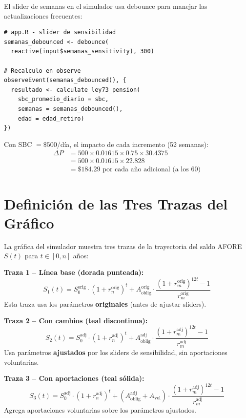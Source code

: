 \documentclass[11pt,a4paper]{report}
\theoremstyle{remark}
\begin{document}
\begin{tcolorbox}[colback=orange!5!white, colframe=orange!75!black, title=\textbf{Aplicaci\'on en C\'odigo}]
El slider de semanas en el simulador usa debounce para manejar las actualizaciones frecuentes:
\begin{lstlisting}
# app.R - slider de sensibilidad
semanas_debounced <- debounce(
  reactive(input$semanas_sensitivity), 300)

# Recalculo en observe
observeEvent(semanas_debounced(), {
  resultado <- calculate_ley73_pension(
    sbc_promedio_diario = sbc,
    semanas = semanas_debounced(),
    edad = edad_retiro)
})
\end{lstlisting}

Con SBC $= \$500$/d\'ia, el impacto de cada incremento (52 semanas):
\begin{align*}
\Delta P &= 500 \times 0.01615 \times 0.75 \times 30.4375 \\
         &= 500 \times 0.01615 \times 22.828 \\
         &= \$184.29 \text{ por cada a\~no adicional (a los 60)}
\end{align*}
\end{tcolorbox}

\section{Definici\'on de las Tres Trazas del Gr\'afico}

\begin{tcolorbox}[colback=blue!5!white, colframe=blue!75!black, title=\textbf{Definici\'on Formal}]
La gr\'afica del simulador muestra tres trazas de la trayectoria del saldo AFORE $S(t)$ para $t \in [0, n]$ a\~nos:

\textbf{Traza 1 -- L\'inea base (dorada punteada):}
\begin{equation}
S_1(t) = S_0^{\text{orig}} \cdot (1 + r_n^{\text{orig}})^t + A_{\text{oblig}}^{\text{orig}} \cdot \frac{(1+r_m^{\text{orig}})^{12t} - 1}{r_m^{\text{orig}}}
\end{equation}
Esta traza usa los par\'ametros \textbf{originales} (antes de ajustar sliders).

\textbf{Traza 2 -- Con cambios (teal discontinua):}
\begin{equation}
S_2(t) = S_0^{\text{adj}} \cdot (1 + r_n^{\text{adj}})^t + A_{\text{oblig}}^{\text{adj}} \cdot \frac{(1+r_m^{\text{adj}})^{12t} - 1}{r_m^{\text{adj}}}
\end{equation}
Usa par\'ametros \textbf{ajustados} por los sliders de sensibilidad, sin aportaciones voluntarias.

\textbf{Traza 3 -- Con aportaciones (teal s\'olida):}
\begin{equation}
S_3(t) = S_0^{\text{adj}} \cdot (1 + r_n^{\text{adj}})^t + (A_{\text{oblig}}^{\text{adj}} + A_{\text{vol}}) \cdot \frac{(1+r_m^{\text{adj}})^{12t} - 1}{r_m^{\text{adj}}}
\end{equation}
Agrega aportaciones voluntarias sobre los par\'ametros ajustados.
\end{tcolorbox}
\end{document}
